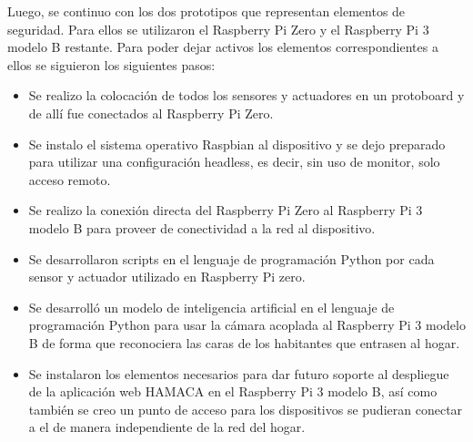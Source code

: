Luego, se continuo con los dos prototipos que representan elementos de seguridad. Para ellos se utilizaron el Raspberry Pi Zero y el Raspberry Pi 3 modelo B restante. Para poder dejar activos los elementos correspondientes a ellos se siguieron los siguientes pasos:
\begin{itemize}
\item  Se realizo la colocación de todos los sensores y actuadores en un protoboard y de allí fue conectados al Raspberry Pi Zero.

\item Se instalo el sistema operativo Raspbian al dispositivo y se dejo preparado para utilizar una configuración headless, es decir, sin uso de monitor, solo acceso remoto.

\item Se realizo la conexión directa del Raspberry Pi Zero al Raspberry Pi 3 modelo B para proveer de conectividad a la red al dispositivo. 

\item Se desarrollaron scripts en el lenguaje de programación Python por cada sensor y actuador utilizado en Raspberry Pi zero.

\item Se desarrolló un modelo de inteligencia artificial en el lenguaje de programación Python para usar la cámara acoplada al Raspberry Pi 3 modelo B de forma que reconociera las caras de los habitantes que entrasen al hogar.  

\item Se instalaron los elementos necesarios para dar futuro soporte al despliegue de la aplicación web HAMACA en el Raspberry Pi 3 modelo B, así como también se creo un punto de acceso para los dispositivos se pudieran conectar a el de manera independiente de la red del hogar. 
\end{itemize}

